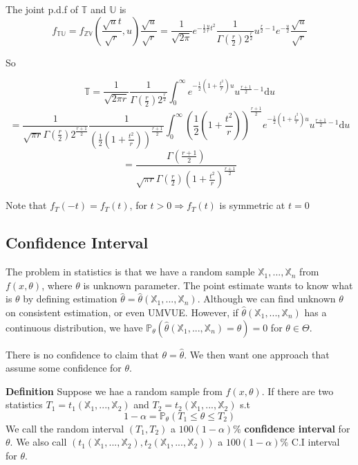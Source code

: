 The joint p.d.f of $\mathbb{T}$ and $\mathbb{U}$ is
$$f_{\mathbb{T}\mathbb{U}} = f_{\mathbb{Z}\mathbb{V}}(\frac{\sqrt{u}t}{\sqrt{r}}, u)\frac{\sqrt{u}}{\sqrt{r}} = 
\frac{1}{\sqrt{2\pi}} e^{-\frac{1}{2}\frac{u}{r}t^2} \frac{1}{\Gamma(\frac{r}{2})2^{\frac{r}{2}}}u^{\frac{r}{2}-1}e^{-\frac{u}{2}}\frac{\sqrt{u}}{\sqrt{r}}$$

So

$$\mathbb{T} = \frac{1}{\sqrt{2\pi r}} \frac{1}{\Gamma(\frac{r}{2})2^{\frac{r}{2}}}
\int_0^\infty e^{-\frac{1}{2}(1+\frac{t^2}{r})u} u^{\frac{r+1}{2}-1}\mathrm{d}u$$
$$= \frac{1}{\sqrt{\pi r}\Gamma(\frac{r}{2})2^{\frac{r+1}{2}}} \frac{1}{(\frac{1}{2}(1+\frac{t^2}{r}))^{\frac{r+1}{2}}}
\int_0^\infty (\frac{1}{2}(1+\frac{t^2}{r}))^{\frac{r+1}{2}}e^{-\frac{1}{2}(1+\frac{t^2}{r})u} u^{\frac{r+1}{2}-1}\mathrm{d}u$$
$$= \frac{\Gamma(\frac{r+1}{2})}{\sqrt{\pi r}\Gamma(\frac{r}{2})(1+\frac{t^2}{r})^{\frac{r+1}{2}}}$$

Note that $ f_T(-t) = f_T(t)$, for $t>0 \Rightarrow f_T(t)$ is symmetric at $t=0$


\subsection{Confidence Interval}
The problem in statistics is that we have a random sample $\mathbb{X}_1, ..., \mathbb{X}_n$ from $f(x, \theta)$, where $\theta$ is unknown parameter. The point estimate wants to know what is $\theta$ by defining estimation $\hat{\theta} = \hat{\theta}(\mathbb{X}_1, ..., \mathbb{X}_n)$. Although we can find unknown $\theta$ on consistent estimation, or even UMVUE. However, if $\hat{\theta}(\mathbb{X}_1, ..., \mathbb{X}_n)$ has a continuous distribution, we have $\mathbb{P}_\theta(\hat{\theta}(\mathbb{X}_1, ..., \mathbb{X}_n) = \theta) = 0$ for $\theta \in \Theta$.

There is no confidence to claim that $\theta = \hat{\theta}$. We then want one approach that assume some confidence for $\theta$.

\textbf{Definition} Suppose we hae a random sample from $f(x, \theta)$. If there are two statistics $T_1 = t_1(\mathbb{X}_1, ..., \mathbb{X}_2)$ and 
$T_2 = t_2(\mathbb{X}_1, ..., \mathbb{X}_2)$ s.t
$$1-\alpha = \mathbb{P}_\theta(T_1 \leq \theta \leq T_2)$$
We call the random interval $(T_1, T_2)$ a $100(1-\alpha)\%$ \textbf{confidence interval} for $\theta$. We also call $(t_1(\mathbb{X}_1, ..., \mathbb{X}_2), t_2(\mathbb{X}_1, ..., \mathbb{X}_2))$ a $100(1-\alpha)\%$ C.I interval for $\theta$.

